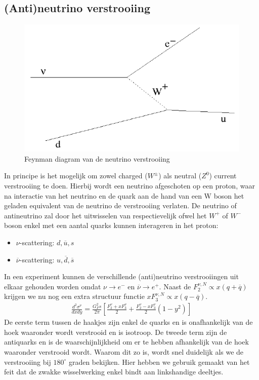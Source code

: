 \documentclass[../main.tex]{subfiles}
\begin{document}
\subsection{(Anti)neutrino verstrooiing}%
\label{sub:_anti_neutrino_verstrooiing}

\begin{figure}[h]
    \centering
    \includegraphics[width=0.8\linewidth]{DIS_nucleon_structuur_pdf/neutrino_scat.png}
    \caption{Feynman diagram van de neutrino verstrooiing}%
    \label{fig:neutrino_scat}
\end{figure}

In principe is het mogelijk om zowel charged ($W^\pm$) als neutral ($Z^0$) current verstrooiing te doen. Hierbij wordt een neutrino afgeschoten op een proton, waar na interactie van het neutrino en de quark aan de hand van een W boson het geladen equivalent van de neutrino de verstrooiing verlaten. De neutrino of antineutrino zal door het uitwisselen van respectievelijk ofwel het $W^+$ of $W^-$ boson enkel met een aantal quarks kunnen interageren in het proton:
\begin{itemize}
    \item $\nu$-scattering: $d,\overline u,s$
    \item $\overline \nu$-scattering: $u,\overline d,\overline s$
\end{itemize}
In een experiment kunnen de verschillende (anti)neutrino verstrooiingen uit elkaar gehouden worden omdat $\nu \rightarrow e^-$ en $\overline \nu \rightarrow e^+$. Naast de $F_2^{\nu,N}\propto x(q+\overline q)$ krijgen we nu nog een extra structuur functie $xF_3^{\nu,N}\propto x(q-\overline q)$.
\begin{equation}
    \begin{aligned}
        \label{eq:struct_func_nucleon_zwak}
        \frac{d^2 \sigma^\nu}{dxdy} = \frac{G_F^2 s}{2\pi} \left[ \frac{F_2^\nu+xF_3^\nu}{2} + \frac{F_2^\nu-xF_3^\nu}{2}(1-y^2) \right]
    \end{aligned}
\end{equation}
De eerste term tussen de haakjes zijn enkel de quarks en is onafhankelijk van de hoek waaronder wordt verstrooid en is isotroop. De tweede term zijn de antiquarks en is de waarschijnlijkheid om er te hebben afhankelijk van de hoek waaronder verstrooid wordt. Waarom dit zo is, wordt snel duidelijk als we de verstrooiing bij $180^\circ$ graden bekijken. Hier hebben we gebruik gemaakt van het feit dat de zwakke wisselwerking enkel bindt aan linkshandige deeltjes.
\end{document}
